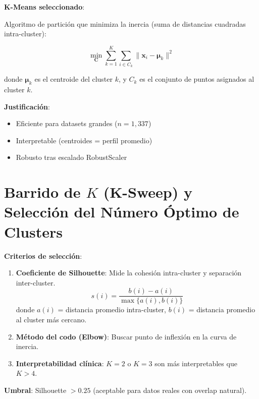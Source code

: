\documentclass[12pt,letterpaper,twoside]{report}
\newcommand{\vect}[1]{\boldsymbol{#1}}
\newcommand{\mat}[1]{\mathbf{#1}}
\begin{document}
\begin{estadisticobox}
\textbf{K-Means seleccionado}:

Algoritmo de partición que minimiza la inercia (suma de distancias cuadradas intra-cluster):

\begin{equation}
\min_{\mat{C}} \sum_{k=1}^{K} \sum_{i \in C_k} \|\vect{x}_i - \vect{\mu}_k\|^2
\end{equation}

donde $\vect{\mu}_k$ es el centroide del cluster $k$, y $C_k$ es el conjunto de puntos asignados al cluster $k$.

\textbf{Justificación}:
\begin{itemize}[noitemsep]
    \item Eficiente para datasets grandes ($n=1,337$)
    \item Interpretable (centroides = perfil promedio)
    \item Robusto tras escalado RobustScaler
\end{itemize}
\end{estadisticobox}

\section{Barrido de $K$ (K-Sweep) y Selección del Número Óptimo de Clusters}

\begin{reglabox}
\textbf{Criterios de selección}:

\begin{enumerate}[noitemsep]
    \item \textbf{Coeficiente de Silhouette}: Mide la cohesión intra-cluster y separación inter-cluster.
    \begin{equation}
    s(i) = \frac{b(i) - a(i)}{\max\{a(i), b(i)\}}
    \end{equation}
    donde $a(i)$ = distancia promedio intra-cluster, $b(i)$ = distancia promedio al cluster más cercano.
    
    \item \textbf{Método del codo (Elbow)}: Buscar punto de inflexión en la curva de inercia.
    
    \item \textbf{Interpretabilidad clínica}: $K=2$ o $K=3$ son más interpretables que $K>4$.
\end{enumerate}

\textbf{Umbral}: Silhouette $> 0.25$ (aceptable para datos reales con overlap natural).
\end{reglabox}
\end{document}
